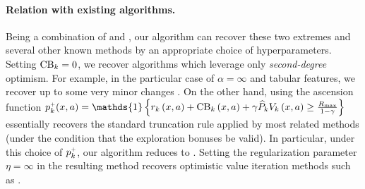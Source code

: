 \paragraph{Relation with existing algorithms.} Being a combination of \RMAXalg and \raviUCB, our algorithm can recover these two extremes and several other known methods by an appropriate choice of hyperparameters. Setting $\operatorname{CB}_k = 0$, we recover algorithms which leverage only \emph{second-degree} optimism. For example, in the particular case of $\alpha = \infty$ and tabular features, we recover \RMAXalg up to some very minor changes \citep{brafman2002r,szita2010model}. On the other hand, using the ascension function $p^\upplus_k(x,a) = \mathds{1}\bc{r_k \spr{x, a} + \CB_k \spr{x, a} + \gamma \wh{ P}_k V_k \spr{x, a} \ge \frac{\RMAX}{1-\gamma}}$ essentially recovers the standard truncation rule applied by most related methods (under the condition that the exploration bonuses be valid). In particular, under this choice of $p^{\mathsf{\scriptscriptstyle +}}_k$, our algorithm reduces to \raviUCB. Setting the regularization parameter $\eta=\infty$ in the resulting method recovers optimistic value iteration methods such as \cite{azar2017minimax,jin2019provably}.
